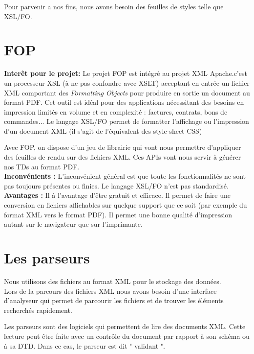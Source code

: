 Pour parvenir a nos fins, nous avons besoin des feuilles de styles
telle que XSL/FO.\\

\section{FOP}

{\bf Inter{\^e}t pour le projet:}
Le projet FOP est int{\'e}gr{\'e} au projet XML Apache.c'est un processeur XSL ({\`a} ne pas confondre avec XSLT) 
acceptant en entr{\'e}e un fichier XML comportant des {\it Formatting Objects} pour produire en sortie un document au format PDF. 
Cet outil est id{\'e}al pour des applications n{\'e}cessitant des besoins en impression limit{\'e}s en volume 
et en complexit{\'e} : factures, contrats, bons de commandes...
Le langage XSL/FO permet de formatter l'affichage ou l'impression d'un
document XML (il s'agit de l'{\'e}quivalent des style-sheet CSS)

Avec FOP, on dispose d'un jeu de librairie qui vont nous permettre d'appliquer des feuilles de rendu sur des fichiers XML.
Ces APIs vont nous servir {\`a} g{\'e}n{\'e}rer nos TDs au format PDF.\\

{\bf Inconv{\'e}nients :} L'inconv{\'e}nient g{\'e}n{\'e}ral est que toute les
fonctionnalit{\'e}s ne sont pas toujours pr{\'e}sentes ou finies. Le langage
XSL/FO n'est pas standardis{\'e}.\\

{\bf Avantages :} Il {\`a} l'avantage d'{\^e}tre gratuit et efficace. Il permet
de faire une conversion en fichiers affichables sur quelque support
que ce soit (par exemple du format XML vers le format PDF). Il permet une bonne
qualit{\'e} d'impression autant sur le navigateur que sur l'imprimante.\\


\section{Les parseurs}
Nous utilisons des fichiers au format XML pour le stockage des donn{\'e}es.\\

Lors de la parcours des fichiers XML nous avons besoin d'une interface d'analyseur qui permet de parcourir les fichiers et de trouver les {\'e}l{\'e}ments recherch{\'e}s rapidement.

Les parseurs sont des logiciels qui permettent de lire des documents XML. Cette lecture peut {\^e}tre faite avec un contr{\^o}le du document par rapport {\`a} son sch{\'e}ma ou {\`a} sa DTD. Dans ce cas, le parseur est dit " validant ".

